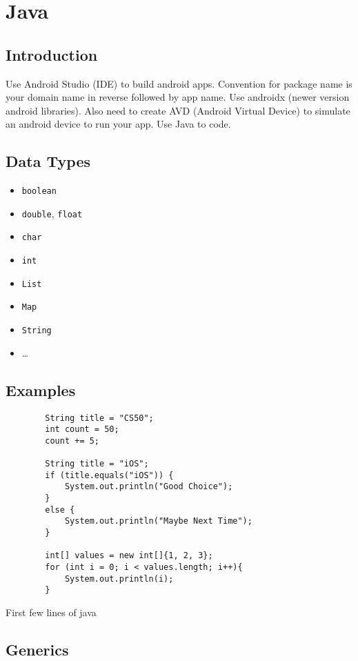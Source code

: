 \chapter{Java}
\section{Introduction}
Use Android Studio (IDE) to build android apps. Convention for package name is
your domain name in reverse followed by app name. Use androidx (newer version
android libraries). Also need to create AVD (Android Virtual Device) to simulate
an android device to run your app. Use Java to code.

\section{Data Types}
\begin{itemize}
	\item \texttt{boolean}
	\item \texttt{double}, \texttt{float}
	\item \texttt{char}
	\item \texttt{int}
	\item \texttt{List}
	\item \texttt{Map}
	\item \texttt{String}
	\item \dots
\end{itemize}

\section{Examples}
\begin{code}
	\begin{verbatim}
		String title = "CS50";
		int count = 50;
		count += 5;

		String title = "iOS";
		if (title.equals("iOS")) {
			System.out.println("Good Choice");
		}
		else {
			System.out.println("Maybe Next Time");
		}

		int[] values = new int[]{1, 2, 3};
		for (int i = 0; i < values.length; i++){
			System.out.println(i);
		}
	\end{verbatim}
	\caption{First few lines of java}
\end{code}

\section{Generics}
